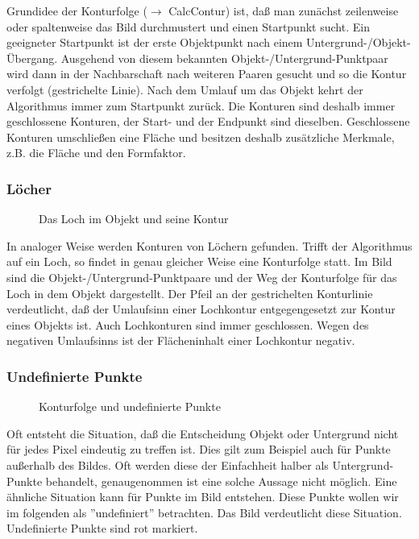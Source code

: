 \documentclass[10pt,titlepage]{article}
\def\see#1{$\to$ #1}
\begin{document}
{Grundidee der Konturfolge ({\see{CalcContur}}) ist, daß man zunächst 
zeilenweise oder spaltenweise das Bild durchmustert und einen Startpunkt 
sucht. Ein geeigneter Startpunkt ist der erste Objektpunkt nach einem
Untergrund-/Objekt-Übergang. Ausgehend von diesem bekannten
Objekt-/Untergrund-Punktpaar wird dann in der Nachbarschaft nach weiteren
Paaren gesucht und so die Kontur verfolgt (gestrichelte Linie). Nach dem
Umlauf um das Objekt kehrt der Algorithmus immer zum Startpunkt zurück. Die
Konturen sind deshalb immer geschlossene Konturen, der Start- und der Endpunkt
sind dieselben. Geschlossene Konturen umschließen eine Fläche und besitzen
deshalb zusätzliche Merkmale, z.B. die Fläche und den Formfaktor.

\subsubsection{Löcher}
\begin{figure}[h]
  \label{fig:hole}
  \caption{Das Loch im Objekt und seine Kontur}
\end{figure}

In analoger Weise werden Konturen von Löchern gefunden. Trifft der Algorithmus
auf ein Loch, so findet in genau gleicher Weise eine Konturfolge statt. Im
Bild sind die Objekt-/Untergrund-Punktpaare und der Weg der
Konturfolge für das Loch in dem Objekt dargestellt. Der Pfeil an der
gestrichelten Konturlinie verdeutlicht, daß der Umlaufsinn einer Lochkontur
entgegengesetzt zur Kontur eines Objekts ist. Auch Lochkonturen sind immer
geschlossen. Wegen des negativen Umlaufsinns ist der Flächeninhalt einer
Lochkontur negativ.

\subsubsection{Undefinierte Punkte}
\label{UndefiniertePunkte}

\begin{figure}[h]
  \label{fig:hole}
  \caption{Konturfolge und undefinierte Punkte}
\end{figure}

Oft entsteht die Situation, daß die Entscheidung Objekt oder Untergrund nicht
für jedes Pixel eindeutig zu treffen ist. Dies gilt zum Beispiel auch für
Punkte außerhalb des Bildes. Oft werden diese der Einfachheit halber als
Untergrund-Punkte behandelt, genaugenommen ist eine solche Aussage nicht
möglich. Eine ähnliche Situation kann für Punkte im Bild entstehen. Diese
Punkte wollen wir im folgenden als ''undefiniert'' betrachten. Das Bild 
verdeutlicht diese Situation. Undefinierte Punkte sind rot markiert.

}
\end{document}
